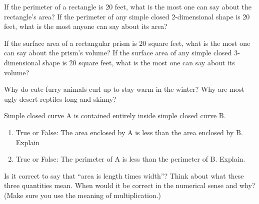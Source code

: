 \begin{prob}
If the perimeter of a rectangle is 20 feet, what is the most one can say about the rectangle's area?  If the perimeter of any simple closed 2-dimensional shape is 20 feet, what is the most anyone can say about its area?
\end{prob}

\begin{prob}
If the surface area of a rectangular prism is 20 square feet, what is the most one can say about the prism's volume?  If the surface area of any simple closed 3-dimensional shape is 20 square feet, what is the most one can say about its volume? 
\end{prob}

\begin{prob}
Why do cute furry animals curl up to stay warm in the winter?  Why are most ugly desert reptiles long and skinny?
\end{prob}

\begin{prob}Simple closed curve A is contained entirely inside simple closed curve B.  
\begin{enumerate}
\item True or False:  The area enclosed by A is less than the area enclosed by B. Explain
\item True or False:  The perimeter of A is less than the perimeter of B. Explain.  
\end{enumerate}
\end{prob}

\begin{prob}
Is it correct to say that ``area is length times width''?  Think about what these three quantities mean.  When would it be correct in the numerical sense and why?  (Make sure you use the meaning of multiplication.)   
\end{prob}



